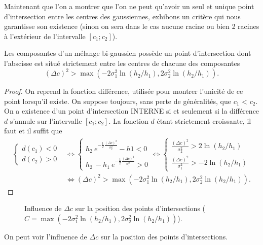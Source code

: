 \documentclass[main.tex]{subfiles}
\begin{document}
Maintenant que l'on a montrer que l'on ne peut qu'avoir un seul et unique point d'intersection entre les centres des gaussiennes, exhibons un critère qui nous garantisse son existence (sinon on sera dans le cas aucune racine ou bien 2 racines à l'extérieur de l'intervalle $[c_1;c_2]$).
\begin{thm}
Les composantes d'un mélange bi-gaussien possède un point d'intersection  dont l'abscisse est situé strictement entre les centres de chacune des composantes \ssi
$$(\Delta c)^2 > \max \left( -2\sigma_1^2 \ln(h_2/h_1) , 2\sigma_2^2 \ln(h_2/h_1) \right). $$
\end{thm}
\begin{proof}
On reprend la fonction différence, utilisée pour montrer l'unicité de ce point lorsqu'il existe. On suppose toujours, sans perte de généralités, que $c_1$ < $c_2$. On a existence d'un point d'intersection INTERNE  si et seulement si la différence $d$ s'annule sur l'intervalle $[c_1;c_2]$. La fonction $d$ étant strictement croissante, il faut et il suffit que
\begin{equation*}
\begin{aligned}
\left\{
\begin{aligned}
d(c_1)<0 \\ d(c_2)>0 
\end{aligned}
\right. &\Longleftrightarrow \left\{
\begin{aligned}
h_2 \ e^{ -\frac{1}{2} \frac{(\Delta c)^2}{\sigma_2^2} } -h1 <0 \\ 
h_2 \  - h_1\ e^{ -\frac{1}{2} \frac{(\Delta c)^2}{\sigma_1^2} }>0 
\end{aligned}
\right. \Longleftrightarrow \left\{
\begin{aligned}
\frac{(\Delta c)^2}{\sigma_2^2} > 2 \ln(  h_2  / h_1  ) \\ 
\frac{(\Delta c)^2}{\sigma_1^2} > -2 \ln( h_2 / h_1 )
\end{aligned}
\right. \\
&\Longleftrightarrow (\Delta c)^2 > \max \left( -2\sigma_1^2 \ln(h_2/h_1) , 2\sigma_2^2 \ln(h_2/h_1) \right).
\end{aligned}
\end{equation*}
\end{proof}
\begin{figure}
\caption{\label{fig:influence_dc} Influence de $\Delta c$ sur la position des points d'intersections (\mbox{$C=\max \left( -2\sigma_1^2 \ln(h_2/h_1) , 2\sigma_2^2 \ln(h_2/h_1) \right)$}).}
\end{figure}


On peut voir l'influence de $\Delta c$ sur la position des points d'intersections.
\end{document}
